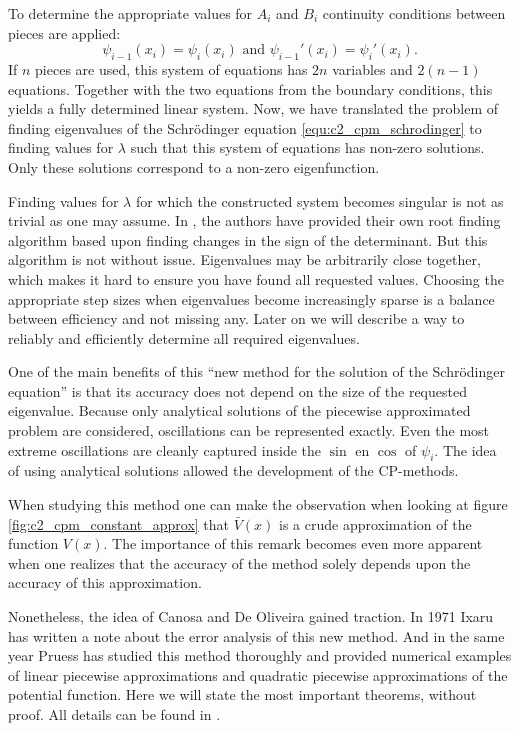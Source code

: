 To determine the appropriate values for $A_i$ and $B_i$ continuity conditions between pieces are applied:
$$
    \psi_{i-1}(x_i) = \psi_{i}(x_i) \text{ and } \psi_{i-1}'(x_i) = \psi_{i}'(x_i) \text{.}
$$
If $n$ pieces are used, this system of equations has $2n$ variables and $2(n-1)$ equations. Together with the two equations from the boundary conditions, this yields a fully determined linear system. Now, we have translated the problem of finding eigenvalues of the Schrödinger equation \eqref{equ:c2_cpm_schrodinger} to finding values for $\lambda$ such that this system of equations has non-zero solutions. Only these solutions correspond to a non-zero eigenfunction.

Finding values for $\lambda$ for which the constructed system becomes singular is not as trivial as one may assume. In \cite{canosa_new_1970}, the authors have provided their own root finding algorithm based upon finding changes in the sign of the determinant. But this algorithm is not without issue. Eigenvalues may be arbitrarily close together, which makes it hard to ensure you have found all requested values. Choosing the appropriate step sizes when eigenvalues become increasingly sparse is a balance between efficiency and not missing any. Later on we will describe a way to reliably and efficiently determine all required eigenvalues.

One of the main benefits of this ``new method for the solution of the Schrödinger equation'' \cite{canosa_new_1970} is that its accuracy does not depend on the size of the requested eigenvalue. Because only analytical solutions of the piecewise approximated problem are considered, oscillations can be represented exactly. Even the most extreme oscillations are cleanly captured inside the $\sin$ en $\cos$ of $\psi_i$. The idea of using analytical solutions allowed the development of the CP-methods.

When studying this method one can make the observation when looking at figure \ref{fig:c2_cpm_constant_approx} that $\bar{V}(x)$ is a crude approximation of the function $V(x)$. The importance of this remark becomes even more apparent when one realizes that the accuracy of the method solely depends upon the accuracy of this approximation.

Nonetheless, the idea of Canosa and De Oliveira gained traction. In 1971 Ixaru \cite{ixaru_error_1972} has written a note about the error analysis of this new method. And in the same year Pruess \cite{pruess_estimating_1973} has studied this method thoroughly and provided numerical examples of linear piecewise approximations and quadratic piecewise approximations of the potential function. Here we will state the most important theorems, without proof. All details can be found in \cite{pruess_estimating_1973}.

